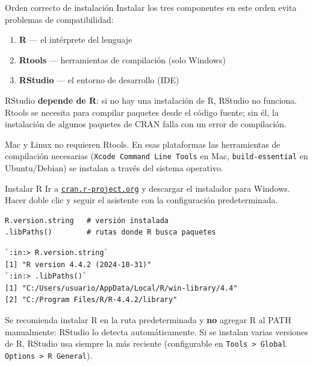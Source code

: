 \documentclass[8pt]{beamer}
\begin{document}
	\subtitle{Cheatsheet de instalación y actualización}

	\begin{frame}[plain]
		\maketitle
	\end{frame}


	\begin{frame}{Orden correcto de instalación}
		Instalar los tres componentes en este orden evita problemas de compatibilidad:

		\begin{enumerate}
			\item \textbf{R} --- el intérprete del lenguaje
			\item \textbf{Rtools} --- herramientas de compilación (solo Windows)
			\item \textbf{RStudio} --- el entorno de desarrollo (IDE)
		\end{enumerate}

		\begin{alertblock}{}
			RStudio \textbf{depende de R}: si no hay una instalación de R, RStudio no funciona. Rtools se necesita para compilar paquetes desde el código fuente; sin él, la instalación de algunos paquetes de CRAN falla con un error de compilación.
		\end{alertblock}

		\begin{block}{}
			Mac y Linux no requieren Rtools. En esas plataformas las herramientas de compilación necesarias (\texttt{Xcode Command Line Tools} en Mac, \texttt{build-essential} en Ubuntu/Debian) se instalan a través del sistema operativo.
		\end{block}
	\end{frame}


	\begin{frame}[fragile]{Instalar R}
		Ir a \href{https://cran.r-project.org/bin/windows/base/}{\texttt{cran.r-project.org}} y descargar el instalador para Windows. Hacer doble clic y seguir el asistente con la configuración predeterminada.

\begin{lstlisting}[style=RScript]
R.version.string   # versión instalada
.libPaths()        # rutas donde R busca paquetes
\end{lstlisting}
\begin{lstlisting}[style=RConsole]
`:in:> R.version.string`
[1] "R version 4.4.2 (2024-10-31)"
`:in:> .libPaths()`
[1] "C:/Users/usuario/AppData/Local/R/win-library/4.4"
[2] "C:/Program Files/R/R-4.4.2/library"
\end{lstlisting}

		\begin{block}{}
			Se recomienda instalar R en la ruta predeterminada y \textbf{no} agregar R al PATH manualmente: RStudio lo detecta automáticamente. Si se instalan varias versiones de R, RStudio usa siempre la más reciente (configurable en \texttt{Tools > Global Options > R General}).
		\end{block}
	\end{frame}
\end{document}
